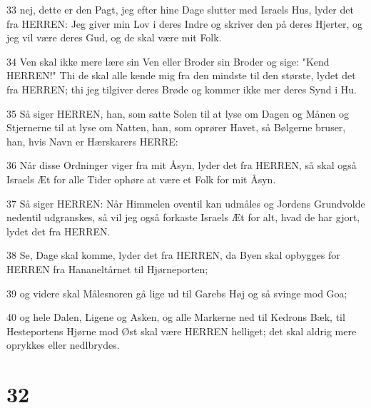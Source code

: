 \par 33 nej, dette er den Pagt, jeg efter hine Dage slutter med Israels Hus, lyder det fra HERREN: Jeg giver min Lov i deres Indre og skriver den på deres Hjerter, og jeg vil være deres Gud, og de skal være mit Folk.
\par 34 Ven skal ikke mere lære sin Ven eller Broder sin Broder og sige: "Kend HERREN!" Thi de skal alle kende mig fra den mindste til den største, lydet det fra HERREN; thi jeg tilgiver deres Brøde og kommer ikke mer deres Synd i Hu.
\par 35 Så siger HERREN, han, som satte Solen til at lyse om Dagen og Månen og Stjernerne til at lyse om Natten, han, som oprører Havet, så Bølgerne bruser, han, hvis Navn er Hærskarers HERRE:
\par 36 Når disse Ordninger viger fra mit Åsyn, lyder det fra HERREN, så skal også Israels Æt for alle Tider ophøre at være et Folk for mit Åsyn.
\par 37 Så siger HERREN: Når Himmelen oventil kan udmåles og Jordens Grundvolde nedentil udgranskes, så vil jeg også forkaste Israels Æt for alt, hvad de har gjort, lydet det fra HERREN.
\par 38 Se, Dage skal komme, lyder det fra HERREN, da Byen skal opbygges for HERREN fra Hananeltårnet til Hjørneporten;
\par 39 og videre skal Målesnoren gå lige ud til Garebs Høj og så svinge mod Goa;
\par 40 og hele Dalen, Ligene og Asken, og alle Markerne ned til Kedrons Bæk, til Hesteportens Hjørne mod Øst skal være HERREN helliget; det skal aldrig mere oprykkes eller nedlbrydes.

\chapter{32}

